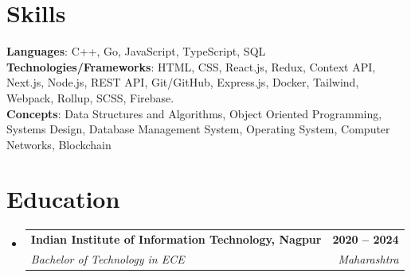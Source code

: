 \documentclass[letterpaper,11pt]{article}
\makeatletter
\newcommand{\resumeSubheading}[4]{
  \vspace{-2pt}\item
    \begin{tabular*}{1.0\textwidth}[t]{l@{\extracolsep{\fill}}r}
      \textbf{#1} & \textbf{\small #2} \\
      \textit{\small#3} & \textit{\small #4} \\
    \end{tabular*}\vspace{-7pt}
}
\newcommand{\resumeSubHeadingListStart}{\begin{itemize}[leftmargin=0.0in, label={}]}
\newcommand{\resumeSubHeadingListEnd}{\end{itemize}}
\makeatother
\begin{document}
\section{Skills}
 \begin{itemize}[leftmargin=0.15in, label={}]
    \small{\item{
     \textbf{Languages}{: C++, Go, JavaScript, TypeScript, SQL} \\
     
     \textbf{Technologies/Frameworks}{: HTML, CSS, React.js, Redux, Context API, Next.js, Node.js, REST API, Git/GitHub, Express.js, Docker, Tailwind, Webpack, Rollup, SCSS, Firebase.} \\
     
     \textbf{Concepts}{: Data Structures and Algorithms,  Object Oriented Programming, Systems Design, Database Management System, Operating System, Computer Networks, Blockchain} \\
     
    }}
 \end{itemize}


\section{Education}
  \resumeSubHeadingListStart
    \resumeSubheading
      {Indian Institute of Information Technology, Nagpur}{2020 --  2024}
      {Bachelor of Technology in ECE}{Maharashtra}
  \resumeSubHeadingListEnd
\end{document}
